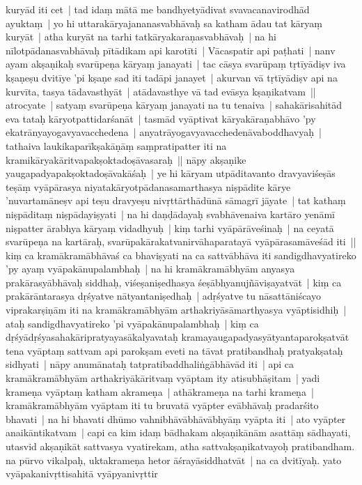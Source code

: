 \documentclass[article,a4paper]{memoir}
\begin{document}
kuryā\-d iti cet | \label{thakur75-85.30} tad idaṃ mā\-tā\- me bandhyetyā\-divat svavacanavirodhā\-d ayuktaṃ | yo hi uttarakā\-ryajananasvabhā\-vaḥ sa katham ā\-dau tat kā\-ryaṃ kuryā\-t | atha kuryā\-t na tarhi tatkā\-ryakaraṇasvabhā\-vaḥ | na hi nī\-lotpā\-danasvabhā\-vaḥ pī\-tā\-dikam api karotī\-ti | \label{thakur75-86.3} Vā\-caspatir api paṭhati | nanv ayam akṣaṇikaḥ svarū\-peṇa kā\-ryaṃ janayati | tac cā\-sya svarū\-paṃ tṛtī\-yā\-diṣv iva kṣaṇeṣu dvitī\-ye 'pi kṣaṇe sad iti tadā\-pi janayet | akurvan vā\- tṛtī\-yā\-diṣv api na kurvī\-ta, tasya tā\-davasthyā\-t | atā\-davasthye vā\- tad evā\-sya kṣaṇikatvam || \label{thakur75-86.7} atrocyate | satyaṃ svarū\-peṇa kā\-ryaṃ janayati na tu tenaiva | sahakā\-risahitā\-d eva tataḥ kā\-ryotpattidarśanā\-t | tasmā\-d vyā\-ptivat kā\-ryakā\-raṇabhā\-vo 'py ekatrā\-nyayogavyavacchedena | anyatrā\-yogavyavacchedenā\-vaboddhavyaḥ | tathaiva laukikaparī\-kṣakā\-ṇā\-ṃ saṃpratipatter iti na kramikā\-ryakā\-ritvapakṣoktadoṣā\-vasaraḥ || \label{thakur75-86.11} nā\-py akṣaṇike yaugapadyapakṣoktadoṣā\-vakā\-śaḥ | ye hi kā\-ryam utpā\-ditavanto dravyaviśeṣā\-s teṣā\-ṃ vyā\-pā\-rasya niyatakā\-ryotpā\-danasamarthasya niṣpā\-dite kā\-rye 'nuvartamā\-neṣv api teṣu dravyeṣu nivṛttā\-rthā\-dū\-nā\- sā\-magrī\- jā\-yate | tat kathaṃ niṣpā\-ditaṃ niṣpā\-dayiṣyati | na hi daṇḍā\-dayaḥ svabhā\-venaiva kartā\-ro yenā\-mī\- niṣpatter ā\-rabhya kā\-ryaṃ vidadhyuḥ | kiṃ tarhi vyā\-pā\-rā\-veśinaḥ | na ceyatā\- svarū\-peṇa na kartā\-raḥ, svarū\-pakā\-rakatvanirvā\-haparatayā\- vyā\-pā\-rasamā\-veśā\-d iti || \label{thakur75-86.17} kiṃ ca kramā\-kramā\-bhā\-vaś ca bhaviṣyati na ca sattvā\-bhā\-va iti sandigdhavyatireko 'py ayaṃ vyā\-pakā\-nupalambhaḥ | na hi kramā\-kramā\-bhyā\-m anyasya prakā\-rasyā\-bhā\-vaḥ siddhaḥ, viśeṣaniṣedhasya śeṣā\-bhyanujñā\-viṣayatvā\-t | \label{thakur75-86.20} kiṃ ca prakā\-rā\-ntarasya dṛśyatve nā\-tyantaniṣedhaḥ | adṛśyatve tu nā\-sattā\-niścayo viprakarṣiṇā\-m iti na kramā\-kramā\-bhyā\-m arthakriyā\-sā\-marthyasya vyā\-ptisidhiḥ | ataḥ sandigdhavyatireko 'pi vyā\-pakā\-nupalambhaḥ | \label{thakur75-86.23} kiṃ ca dṛśyā\-dṛśyasahakā\-ripratyayasā\-kalyavataḥ kramayaugapadyasyā\-tyantaparokṣatvā\-t tena vyā\-ptaṃ sattvam api parokṣam eveti na tā\-vat pratibandhaḥ pratyakṣataḥ sidhyati | nā\-py anumā\-nataḥ tatpratibaddhaliṅgā\-bhā\-vā\-d iti | \label{thakur75-86.26} api ca kramā\-kramā\-bhyā\-m arthakriyā\-kā\-ritvaṃ vyā\-ptam ity atisubhā\-ṣitam | yadi krameṇa vyā\-ptaṃ katham akrameṇa | athā\-krameṇa na tarhi krameṇa | kramā\-kramā\-bhyā\-m vyā\-ptam iti tu bruvatā\- vyā\-pter evā\-bhā\-vaḥ pradarśito bhavati | na hi bhavati dhū\-mo vahnibhā\-vā\-bhā\-vā\-bhyā\-ṃ vyā\-pta iti | ato vyā\-pter anaikā\-ntikatvam | \label{thakur75-86.30} capi ca kim idaṃ bā\-dhakam akṣaṇikā\-nā\-m asattā\-ṃ sā\-dhayati, utasvid akṣaṇikā\-t sattvasya vyatirekam, atha sattvakṣaṇikatvayoḥ pratibandham. \label{thakur75-86.31} na pū\-rvo vikalpaḥ, uktakrameṇa hetor ā\-śrayā\-siddhatvā\-t | \label{thakur75-87.1} na ca dvitī\-yaḥ. yato vyā\-pakanivṛttisahitā\- vyā\-pyanivṛttir 
\end{document}
